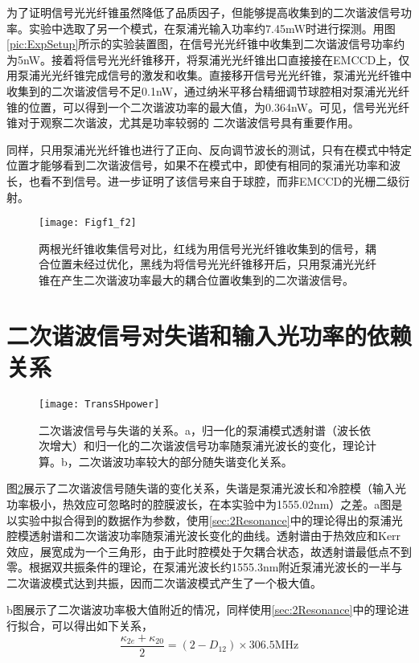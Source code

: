 为了证明信号光光纤锥虽然降低了品质因子，但能够提高收集到的二次谐波信号功率。实验中选取了另一个模式，在泵浦光输入功率约7.45mW时进行探测。用图\ref{pic:ExpSetup}所示的实验装置图，在信号光光纤锥中收集到二次谐波信号功率约为5nW。接着将信号光光纤锥移开，将泵浦光光纤锥出口直接接在EMCCD上，仅用泵浦光光纤锥完成信号的激发和收集。直接移开信号光光纤锥，泵浦光光纤锥中收集到的二次谐波信号不足0.1nW，通过纳米平移台精细调节球腔相对泵浦光光纤锥的位置，可以得到一个二次谐波功率的最大值，为0.364nW。可见，信号光光纤锥对于观察二次谐波，尤其是功率较弱的 二次谐波信号具有重要作用。

同样，只用泵浦光光纤锥也进行了正向、反向调节波长的测试，只有在模式中特定位置才能够看到二次谐波信号，如果不在模式中，即使有相同的泵浦光功率和波长，也看不到信号。进一步证明了该信号来自于球腔，而非EMCCD的光栅二级衍射。

\begin{figure}
\centering
\texttt{[image: Figf1\_f2]}
\caption{两根光纤锥收集信号对比，红线为用信号光光纤锥收集到的信号，耦合位置未经过优化，黑线为将信号光光纤锥移开后，只用泵浦光光纤锥在产生二次谐波功率最大的耦合位置收集到的二次谐波信号。}
\label{pic:Figf1_f2}
\end{figure}

\section{二次谐波信号对失谐和输入光功率的依赖关系}


\begin{figure}
\centering
\texttt{[image: TransSHpower]}
\caption{二次谐波信号与失谐的关系。a，归一化的泵浦模式透射谱（波长依次增大）和归一化的二次谐波信号功率随泵浦光波长的变化，理论计算。b，二次谐波功率较大的部分随失谐变化关系。}
\label{pic:TransSHpower}
\end{figure}

图\ref{pic:TransSHpower}展示了二次谐波信号随失谐的变化关系，失谐是泵浦光波长和冷腔模（输入光功率极小，热效应可忽略时的腔膜波长，在本实验中为1555.02nm）之差。a图是以实验中拟合得到的数据作为参数，使用\ref{sec:2Resonance}中的理论得出的泵浦光腔模透射谱和二次谐波功率随泵浦光波长变化的曲线。透射谱由于热效应和Kerr效应，展宽成为一个三角形\cite{carmon2004dynamical}，由于此时腔模处于欠耦合状态，故透射谱最低点不到零。根据双共振条件的理论，在泵浦光波长约1555.3nm附近泵浦光波长的一半与二次谐波模式达到共振，因而二次谐波模式产生了一个极大值。

b图展示了二次谐波功率极大值附近的情况，同样使用\ref{sec:2Resonance}中的理论进行拟合，可以得出如下关系，
\begin{equation}
\frac{\kappa_{2e}+\kappa_{20}}{2} = (2-D_{12})\times 306.5\mathrm{ MHz}
\end{equation}

